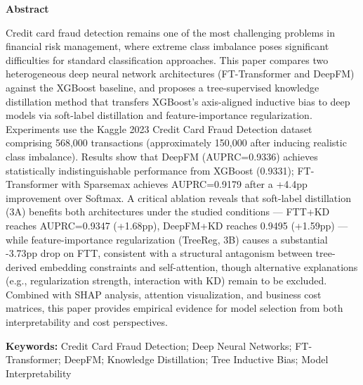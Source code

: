 \begin{abstract}
\noindent
信用卡欺诈检测是金融风控领域最具挑战性的问题之一，其类别高度不平衡的特性对机器学习方法提出了严峻考验。本文基于Kaggle 2023年信用卡欺诈检测数据集（56.8万条交易记录，经类别不平衡处理后使用约15万条样本），比较了两种异构深度神经网络架构（FT-Transformer、DeepFM）与XGBoost传统基线在欺诈检测任务上的表现，并提出了一种基于树归纳偏置迁移的知识蒸馏优化方案——将XGBoost的轴对齐分裂先验通过软标签蒸馏和特征重要性正则化迁移至深度模型。实验结果表明，DeepFM（AUPRC=0.9336）达到与XGBoost（0.9331）统计上不可区分的性能水平；FT-Transformer经Sparsemax替代Softmax后AUPRC达0.9179，且获得最低业务成本（Cost=99）。Tree-Supervised蒸馏消融实验揭示了一个关键的因果区分：软标签蒸馏（3A）在本研究条件下对两种架构均产生正向增益——FTT+KD达AUPRC=0.9347（+1.68pp）、DeepFM+KD达0.9495（+1.59pp），两者校准均近乎完美（ECE$<$0.001）；然而，特征重要性正则化（TreeReg, 3B）将FTT从0.9347大幅拖降至0.8974（-3.73pp），该效应与"树先验对嵌入层的刚性约束与Sparsemax注意力的自由交互学习存在结构性冲突"的假设一致，但替代解释（正则化强度不当、与KD的交互效应等）尚未完全排除。本文还结合SHAP分析、注意力可视化和商业成本矩阵，从可解释性和业务成本两个维度为模型选择提供实证依据。

\vspace{1em}
\noindent\textbf{关键词：}信用卡欺诈检测；深度神经网络；FT-Transformer；DeepFM；知识蒸馏；树归纳偏置；模型可解释性
\end{abstract}

\begin{center}
{\Large\textbf{Abstract}}
\end{center}
\noindent
Credit card fraud detection remains one of the most challenging problems in financial risk management, where extreme class imbalance poses significant difficulties for standard classification approaches. This paper compares two heterogeneous deep neural network architectures (FT-Transformer and DeepFM) against the XGBoost baseline, and proposes a tree-supervised knowledge distillation method that transfers XGBoost's axis-aligned inductive bias to deep models via soft-label distillation and feature-importance regularization. Experiments use the Kaggle 2023 Credit Card Fraud Detection dataset comprising 568,000 transactions (approximately 150,000 after inducing realistic class imbalance). Results show that DeepFM (AUPRC=0.9336) achieves statistically indistinguishable performance from XGBoost (0.9331); FT-Transformer with Sparsemax achieves AUPRC=0.9179 after a +4.4pp improvement over Softmax. A critical ablation reveals that soft-label distillation (3A) benefits both architectures under the studied conditions — FTT+KD reaches AUPRC=0.9347 (+1.68pp), DeepFM+KD reaches 0.9495 (+1.59pp) — while feature-importance regularization (TreeReg, 3B) causes a substantial -3.73pp drop on FTT, consistent with a structural antagonism between tree-derived embedding constraints and self-attention, though alternative explanations (e.g., regularization strength, interaction with KD) remain to be excluded. Combined with SHAP analysis, attention visualization, and business cost matrices, this paper provides empirical evidence for model selection from both interpretability and cost perspectives.

\vspace{1em}
\noindent\textbf{Keywords:} Credit Card Fraud Detection; Deep Neural Networks; FT-Transformer; DeepFM; Knowledge Distillation; Tree Inductive Bias; Model Interpretability
